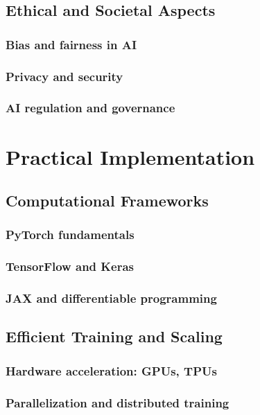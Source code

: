 \chapter{Ethical and Societal Aspects}
\section{Bias and fairness in AI}
\section{Privacy and security}
\section{AI regulation and governance}

\part{Practical Implementation}

\chapter{Computational Frameworks}
\section{PyTorch fundamentals}
\section{TensorFlow and Keras}
\section{JAX and differentiable programming}

\chapter{Efficient Training and Scaling}
\section{Hardware acceleration: GPUs, TPUs}
\section{Parallelization and distributed training}
